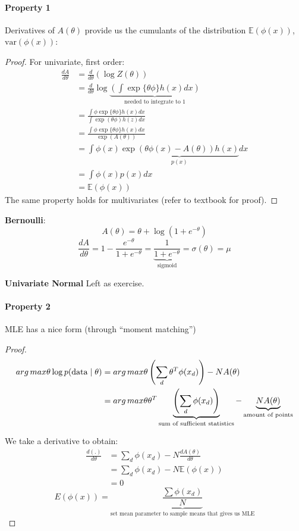 \documentclass{article}
\begin{document}
\paragraph{Property 1} Derivatives of $A(\theta)$ provide us the cumulants of the distribution $\mathbb{E}(\phi(x))$, $\text{var}(\phi(x))$:
\begin{proof}
For univariate, first order:
\begin{align*}
\frac{d A}{d \theta} &= \frac{d}{d\theta}(\log Z(\theta)) \\
&= \frac{d}{d \theta} \log \underbrace{\left(\int \exp\{\theta \phi\} h(x) dx\right)}_{\text{needed to integrate to $1$}} \\
&= \frac{\int\phi \exp\{\theta\phi\}h(x) dx}{\int \exp( \theta \phi) h(z) dx}\\
&= \frac{\int\phi \exp\{\theta\phi\}h(x) dx}{\exp(A(\theta))} \\
&= \int \phi(x) \underbrace{\exp(\theta \phi(x) - A(\theta)) h(x)}_{p(x)} dx\\
&= \int \phi(x) p(x) dx \\
&= \mathbb{E}(\phi(x))
\end{align*}
The same property holds for multivariates (refer to textbook for proof). 
\end{proof}

\textbf{Bernoulli}: 
\[A(\theta) = \theta + \log(1 + e^{-\theta})\]
\[\frac{d A}{d\theta} = 1 - \frac{e^{-\theta}}{1 + e^{-\theta}} = \underbrace{\frac{1}{1 + e^{-\theta}}}_{\text{sigmoid}} = \sigma(\theta) = \mu \]

\textbf{Univariate Normal} Left as exercise.
\paragraph{Property 2} MLE has a nice form (through ``moment matching'')
\begin{proof}
\begin{align*} arg\,max{\theta} \log p(\text{data} \mid \theta) &= arg\,max{\theta} \left(\sum_d \theta^T\phi(x_d)\right) - NA(\theta) \\
&= arg\,max{\theta}\theta^T\underbrace{\left(\sum_d\phi(x_d)\right)}_{\text{sum of sufficient statistics}} - \underbrace{NA(\theta)}_{\text{amount of points}}
\end{align*}

We take a derivative to obtain:
\begin{align*}
\frac{d(.)}{d \theta} &= \sum_d \phi(x_d) - N \frac{dA(\theta)}{d \theta} \\
&= \sum_d\phi(x_d) - N\mathbb{E}(\phi(x)) \\
 &= 0
\end{align*}
\[{E}(\phi(x)) = \underbrace{\frac{\sum\phi(x_d)}{N}}_{\text{set mean parameter to sample means that gives us MLE}}
\]
\end{proof}
\end{document}
